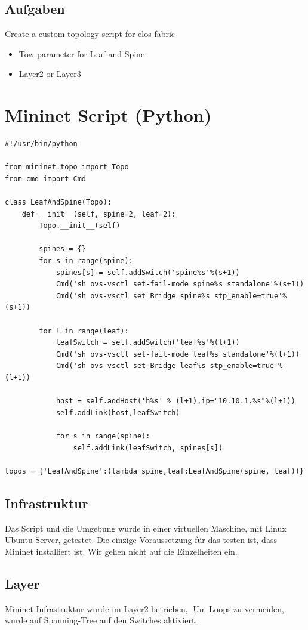 \documentclass[a4,12pt]{scrartcl}
\begin{document}
\subsection{Aufgaben}
Create a custom topology script for clos fabric
\begin{itemize}
\item Tow parameter for Leaf and Spine
\item Layer2 or Layer3
\end{itemize}

\section{Mininet Script (Python)}
\begin{lstlisting}
#!/usr/bin/python

from mininet.topo import Topo
from cmd import Cmd

class LeafAndSpine(Topo):
    def __init__(self, spine=2, leaf=2):
        Topo.__init__(self)

        spines = {}
        for s in range(spine):
            spines[s] = self.addSwitch('spine%s'%(s+1))
            Cmd('sh ovs-vsctl set-fail-mode spine%s standalone'%(s+1))
            Cmd('sh ovs-vsctl set Bridge spine%s stp_enable=true'%(s+1))

        for l in range(leaf):
            leafSwitch = self.addSwitch('leaf%s'%(l+1))
            Cmd('sh ovs-vsctl set-fail-mode leaf%s standalone'%(l+1))
            Cmd('sh ovs-vsctl set Bridge leaf%s stp_enable=true'%(l+1))
            
            host = self.addHost('h%s' % (l+1),ip="10.10.1.%s"%(l+1))
            self.addLink(host,leafSwitch)

            for s in range(spine):
                self.addLink(leafSwitch, spines[s])

topos = {'LeafAndSpine':(lambda spine,leaf:LeafAndSpine(spine, leaf))}
\end{lstlisting}

\subsection{Infrastruktur}
Das Script und die Umgebung wurde in einer virtuellen Maschine, mit Linux Ubuntu Server, getestet. Die einzige Voraussetzung für das testen ist, dass Mininet installiert ist. Wir gehen nicht auf die Einzelheiten ein.

\subsection{Layer}
Mininet Infrastruktur wurde im Layer2 betrieben,. Um Loops zu vermeiden, wurde auf Spanning-Tree auf den Switches aktiviert. 
\end{document}
